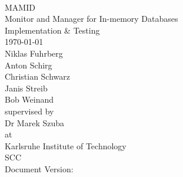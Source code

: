 \documentclass[a4paper, 11pt]{article}
\makeatletter
\newcommand*{\glsaddnp}[2][]{
  \glsdoifexists{#2}{
    \def\@glsnumberformat{glsgobblenumber}
    \edef\@gls@counter{\csname glo@#2@counter\endcsname}
    \setkeys{glossadd}{#1}
    \@gls@saveentrycounter
    \@do@wrglossary{#2}
  }
}
\renewcommand{\glsaddallunused}[1][]{
  \edef\@glo@type{\@glo@types}
  \setkeys{glossadd}{#1}
  \forallglsentries[\@glo@type]{\@glo@entry}{
    \ifglsused{\@glo@entry}{}{
      \glsaddnp[#1]{\@glo@entry}}}
}
\makeatother
\begin{document}


\begin{titlepage}
\makeatletter
\begin{center}
~\\[4em]
{\Huge MAMID}\\[.8em]\huge{Monitor and Manager for In-memory Databases}\\[2em]
{\huge Implementation \& Testing}\\[1em]
{\large\today}\\[2.5em]
{\LARGE
Niklas Fuhrberg\\
Anton Schirg\\
Christian Schwarz\\
Janis Streib\\
Bob Weinand\\[3em]}
{\Large supervised by}\\[2em]
{\LARGE
Dr Marek Szuba\\[1em]}
{\Large at}\\[1em]
{\LARGE
Karlsruhe Institute of Technology\\
SCC\\[2em]}
{\color{gray}
  \small Document Version: 
}
\end{center}
\makeatother
\end{titlepage}
\newpage
\tableofcontents
\newpage








\makeatother
\end{document}
